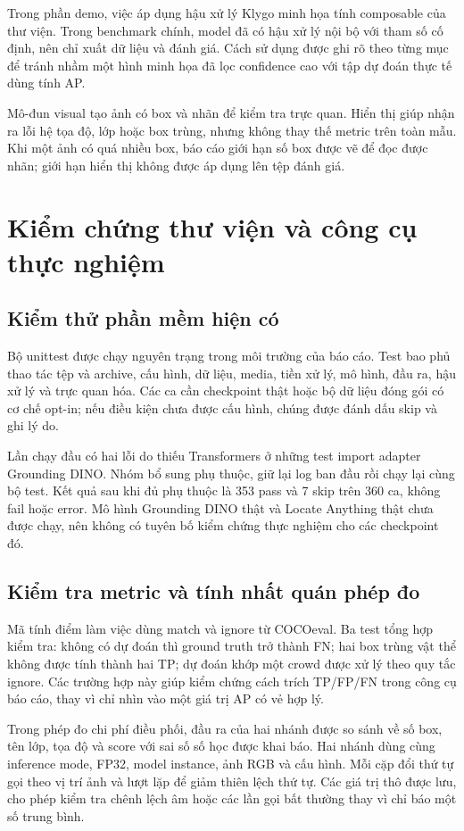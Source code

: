 Trong phần demo, việc áp dụng hậu xử lý Klygo minh họa tính composable của thư viện. Trong benchmark chính, model đã có hậu xử lý nội bộ với tham số cố định, nên chỉ xuất dữ liệu và đánh giá. Cách sử dụng được ghi rõ theo từng mục để tránh nhầm một hình minh họa đã lọc confidence cao với tập dự đoán thực tế dùng tính AP.

Mô-đun visual tạo ảnh có box và nhãn để kiểm tra trực quan. Hiển thị giúp nhận ra lỗi hệ tọa độ, lớp hoặc box trùng, nhưng không thay thế metric trên toàn mẫu. Khi một ảnh có quá nhiều box, báo cáo giới hạn số box được vẽ để đọc được nhãn; giới hạn hiển thị không được áp dụng lên tệp đánh giá.

\section{Kiểm chứng thư viện và công cụ thực nghiệm}
\subsection{Kiểm thử phần mềm hiện có}
Bộ unittest được chạy nguyên trạng trong môi trường của báo cáo. Test bao phủ thao tác tệp và archive, cấu hình, dữ liệu, media, tiền xử lý, mô hình, đầu ra, hậu xử lý và trực quan hóa. Các ca cần checkpoint thật hoặc bộ dữ liệu đóng gói có cơ chế opt-in; nếu điều kiện chưa được cấu hình, chúng được đánh dấu skip và ghi lý do.

Lần chạy đầu có hai lỗi do thiếu Transformers ở những test import adapter Grounding DINO. Nhóm bổ sung phụ thuộc, giữ lại log ban đầu rồi chạy lại cùng bộ test. Kết quả sau khi đủ phụ thuộc là 353 pass và 7 skip trên 360 ca, không fail hoặc error. Mô hình Grounding DINO thật và Locate Anything thật chưa được chạy, nên không có tuyên bố kiểm chứng thực nghiệm cho các checkpoint đó.

\subsection{Kiểm tra metric và tính nhất quán phép đo}
Mã tính điểm làm việc dùng match và ignore từ COCOeval. Ba test tổng hợp kiểm tra: không có dự đoán thì ground truth trở thành FN; hai box trùng vật thể không được tính thành hai TP; dự đoán khớp một crowd được xử lý theo quy tắc ignore. Các trường hợp này giúp kiểm chứng cách trích TP/FP/FN trong công cụ báo cáo, thay vì chỉ nhìn vào một giá trị AP có vẻ hợp lý.

Trong phép đo chi phí điều phối, đầu ra của hai nhánh được so sánh về số box, tên lớp, tọa độ và score với sai số số học được khai báo. Hai nhánh dùng cùng inference mode, FP32, model instance, ảnh RGB và cấu hình. Mỗi cặp đổi thứ tự gọi theo vị trí ảnh và lượt lặp để giảm thiên lệch thứ tự. Các giá trị thô được lưu, cho phép kiểm tra chênh lệch âm hoặc các lần gọi bất thường thay vì chỉ báo một số trung bình.
